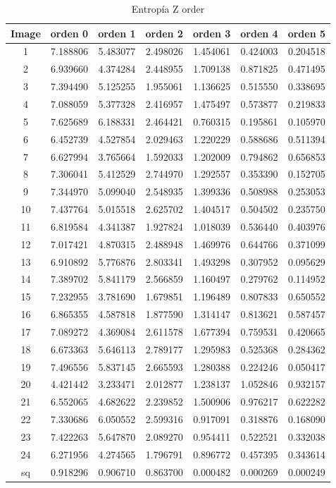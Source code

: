 \documentclass[12pt]{article}
\begin{document}
\begin{table}[h]
	\centering
	\label{tab:label}
	\begin{tabular}{|c|c|c|c|c|c|c|}
		\hline
		Image & orden 0 & orden 1 & orden 2 & orden 3 & orden 4 & orden 5\\
		\hline
		1 &7.188806 &5.483077 &2.498026 &1.454061 &0.424003 &0.204518 \\
		\hline
		2 &6.939660 &4.374284 &2.448955 &1.709138 &0.871825 &0.471495 \\
		\hline
		3 &7.394490 &5.125255 &1.955061 &1.136625 &0.515550 &0.338695 \\
		\hline
		4 &7.088059 &5.377328 &2.416957 &1.475497 &0.573877 &0.219833 \\
		\hline
		5 &7.625689 &6.188331 &2.464421 &0.760315 &0.195861 &0.105970 \\
		\hline
		6 &6.452739 &4.527854 &2.029463 &1.220229 &0.588686 &0.511394 \\
		\hline
		7 &6.627994 &3.765664 &1.592033 &1.202009 &0.794862 &0.656853 \\
		\hline
		8 &7.306041 &5.412529 &2.744970 &1.292557 &0.353390 &0.152705 \\
		\hline
		9 &7.344970 &5.099040 &2.548935 &1.399336 &0.508988 &0.253053 \\
		\hline
		10&7.437764 &5.015518 &2.625702 &1.404517 &0.504502 &0.235750 \\
		\hline
		11&6.819584 &4.341387 &1.927824 &1.018039 &0.536440 &0.403976 \\
		\hline
		12&7.017421 &4.870315 &2.488948 &1.469976 &0.644766 &0.371099 \\
		\hline
		13&6.910892 &5.776876 &2.803341 &1.493298 &0.307952 &0.095629 \\
		\hline
		14&7.389702 &5.841179 &2.566859 &1.160497 &0.279762 &0.114952 \\
		\hline
		15&7.232955 &3.781690 &1.679851 &1.196489 &0.807833 &0.650552 \\
		\hline
		16&6.865355 &4.587818 &1.877590 &1.314147 &0.813621 &0.587457 \\
		\hline
		17&7.089272 &4.369084 &2.611578 &1.677394 &0.759531 &0.420665 \\
		\hline
		18&6.673363 &5.646113 &2.789177 &1.295983 &0.525368 &0.284362 \\
		\hline
		19&7.496556 &5.837145 &2.665593 &1.280388 &0.224246 &0.050417 \\
		\hline
		20&4.421442 &3.233471 &2.012877 &1.238137 &1.052846 &0.932157 \\
		\hline
		21&6.552065 &4.682622 &2.239852 &1.500906 &0.976217 &0.622282 \\
		\hline
		22&7.330686 &6.050552 &2.599316 &0.917091 &0.318876 &0.168090 \\
		\hline
		23&7.422263 &5.647870 &2.089270 &0.954411 &0.522521 &0.332038 \\
		\hline
		24&6.271956 &4.274565 &1.796791 &0.896772 &0.457395 &0.343614 \\
		\hline
		sq&0.918296 &0.906710 &0.863700 &0.000482 &0.000269 &0.000249 \\
		\hline
	\end{tabular}
	\caption{Entropía Z order}
\end{table}
\end{document}
